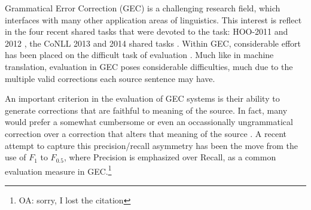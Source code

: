 \documentclass[english]{article}
\newcommand{\oa}[1]{\footnote{\color{red}OA: #1}}
\begin{document}



Grammatical Error Correction (GEC) is a challenging research field, which interfaces with many other application areas of linguistics. This interest is reflect in the four recent shared tasks that were devoted to the task: HOO-2011 and 2012 \cite{dale2011helping,dale2012hoo}, the CoNLL 2013 and 2014
shared tasks \cite{kao2013conll,ng2014conll}.
Within GEC, considerable effort has been placed on the difficult task of
evaluation \cite{tetreault2008native,madnani2011they,chodorow2012problems,dahlmeier2012better}.
Much like in machine translation, evaluation in GEC poses considerable difficulties, much
due to the multiple valid corrections each source sentence may have.

An important criterion in the evaluation of GEC systems is their ability to
generate corrections that are faithful to meaning of the source. In fact, many would prefer
a somewhat cumbersome or even an occassionally ungrammatical correction over a correction
that alters that meaning of the source \citet{brockett2006correcting}.
A recent attempt to capture this precision/recall asymmetry has been the move from the use of $F_1$
to $F_{0.5}$, where Precision is emphasized over Recall, as a common evaluation measure
in GEC.\oa{sorry, I lost the citation}
\end{document}

